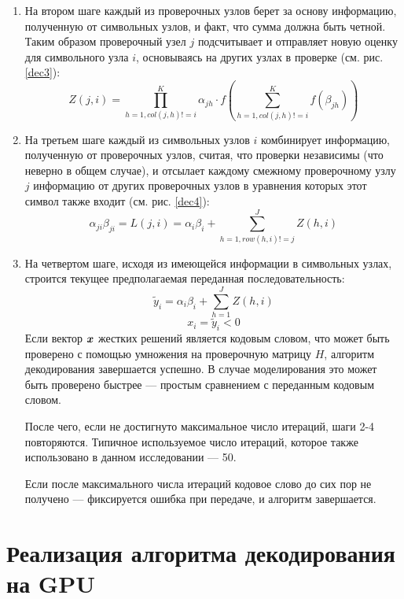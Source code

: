 \begin{enumerate}[label=\arabic*.]
\item На втором шаге каждый из проверочных узлов берет за основу информацию, полученную от символьных узлов, и факт,
что сумма должна быть четной. Таким образом проверочный узел $j$ подсчитывает и отправляет новую оценку
 для символьного узла $i$, основываясь на других узлах в проверке (см. рис. \ref{dec3}):
\begin{equation} \label{step2}
Z(j,i)=\prod_{h=1,col(j,h)!=i}^{K} \alpha_{jh} \cdot
		f(\sum_{h=1,col(j,h)!=i}^{K}f(\beta_{jh}))
\end{equation}

\item На третьем шаге каждый из символьных узлов $i$ комбинирует информацию, полученную от проверочных узлов,
считая, что проверки независимы (что неверно в общем случае), и отсылает каждому смежному проверочному узлу $j$ 
информацию от других проверочных узлов в уравнения которых этот символ также входит (см. рис. \ref{dec4}):
\begin{equation} \label{step3}
\alpha_{ji} \beta_{ji} = L(j,i)=\alpha_i \beta_i + \sum_{h=1,row(h,i)!=j}^J Z(h,i)
\end{equation}

\item На четвертом шаге, исходя из имеющейся информации в символьных узлах, строится текущее предполагаемая
переданная последовательность:
\begin{equation} \label{step4}
	\widetilde{y}_i = \alpha_i \beta_i + \sum_{h=1}^J Z(h,i)
\end{equation}
\[
	x_i = \widetilde{y}_i < 0
\]
Если вектор $\boldsymbol{x}$ жестких решений является кодовым словом, что может быть проверено с помощью умножения
 на проверочную матрицу
$H$, алгоритм декодирования завершается успешно. В случае моделирования это может быть проверено быстрее ---
простым сравнением с переданным кодовым словом.

После чего, если не достигнуто максимальное число итераций, шаги 2-4 повторяются.
 Типичное используемое число итераций, которое также использовано в данном исследовании --- 50.

Если после максимального числа итераций кодовое слово до сих пор не получено --- фиксируется ошибка при
передаче, и алгоритм завершается.
\end{enumerate}
\section{Реализация алгоритма декодирования на GPU}

